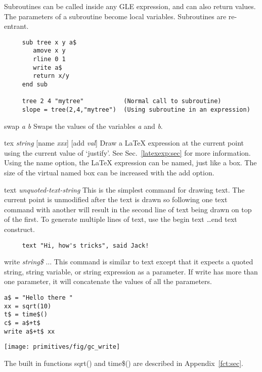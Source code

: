 \begin{commanddescription}
Subroutines can be called inside any GLE expression, and can
also return values.  The parameters of a subroutine become local variables.
Subroutines are re-entrant.

\begin{Verbatim}
     sub tree x y a$
        amove x y
        rline 0 1
        write a$
        return x/y
     end sub

     tree 2 4 "mytree"           (Normal call to subroutine)
     slope = tree(2,4,"mytree")  (Using subroutine in an expression)
\end{Verbatim}

\item[{\sf swap {\it a b} }]
 Swaps the values of the variables {\it a} and {\it b}.

\item[{\sf tex {\it string} [name {\it xxx}] [add {\it val}]}]
Draw a \LaTeX{} expression at the current point using the current value of `justify'. See Sec.~\ref{latexexp:sec} for more information. Using the {\sf name} option, the \LaTeX{} expression can be named, just like a box. The size of the virtual named box can be increased with the {\sf add} option.

\item[{\sf text {\it unquoted-text-string}}]
  This is the simplest command for drawing text.  The current point
is unmodified after the text is drawn so following one text command
with another will result in the second line of text being drawn on
top of the first.
To generate multiple lines of text, use the {\sf begin text} \ldots {\sf  end
text} construct.

\preglecode{}
\begin{Verbatim}
     text "Hi, how's tricks", said Jack!
\end{Verbatim}
\postglecode{}

\item[{\sf write {\it string\$} $\ldots$}]
 This command is similar to {\sf text} except that it expects a quoted string,
string variable, or string expression as a parameter. If write has more than one parameter, it will concatenate the values of all the parameters.

\begin{minipage}[c]{8cm}
\begin{Verbatim}
a$ = "Hello there "
xx = sqrt(10)
t$ = time$()
c$ = a$+t$
write a$+t$ xx
\end{Verbatim}
\end{minipage}
\hfill
\begin{minipage}[c]{7cm}
\mbox{\texttt{[image: primitives/fig/gc\_write]}}
\end{minipage}

The built in functions {\sf sqrt()} and {\sf time\$()} are described in
Appendix~\ref{fct:sec}.

\end{commanddescription}

